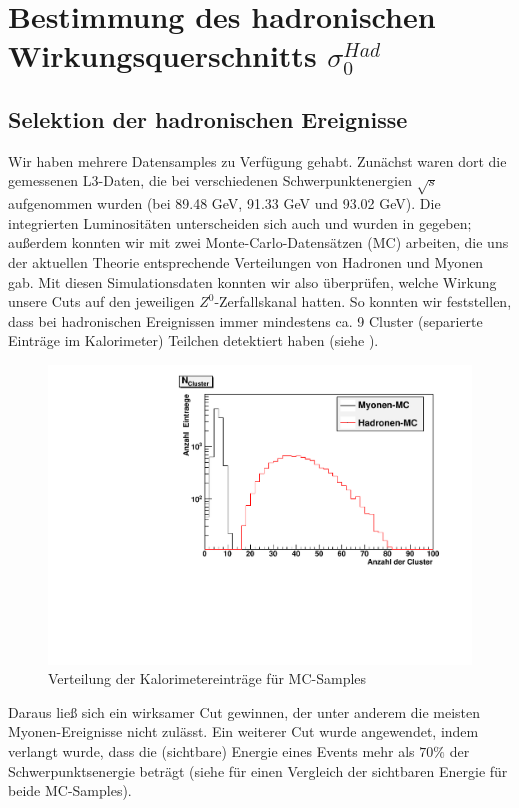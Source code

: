 \section{Bestimmung des hadronischen Wirkungsquerschnitts $\sigma_0^{Had}$}
\subsection{Selektion der hadronischen Ereignisse}
Wir haben mehrere Datensamples zu Verfügung gehabt. Zunächst waren dort die gemessenen L3-Daten, die bei verschiedenen Schwerpunktenergien $\sqrt{s}$ aufgenommen wurden (bei 89.48 GeV, 91.33 GeV und 93.02 GeV). Die integrierten Luminositäten unterscheiden sich auch und wurden in \cite[S.9]{script} gegeben; außerdem konnten wir mit zwei Monte-Carlo-Datensätzen (MC) arbeiten, die uns der aktuellen Theorie entsprechende Verteilungen von Hadronen und Myonen gab. Mit diesen Simulationsdaten konnten wir also überprüfen, welche Wirkung unsere Cuts auf den jeweiligen $Z^0$-Zerfallskanal hatten. So konnten wir feststellen, dass bei hadronischen Ereignissen immer mindestens ca. 9 Cluster (separierte Einträge im Kalorimeter) Teilchen detektiert haben (siehe ).
\begin{figure}[htb]
	\centering
	\includegraphics[width=1\columnwidth,keepaspectratio]{Ncluster_vgl.pdf}
	\caption{Verteilung der Kalorimetereinträge für MC-Samples}
	\label{fig:Ncluster_vgl}
\end{figure}
Daraus ließ sich ein wirksamer Cut gewinnen, der unter anderem die meisten Myonen-Ereignisse nicht zulässt. Ein weiterer Cut wurde angewendet, indem verlangt wurde, dass die (sichtbare) Energie eines Events mehr als $70\%$ der Schwerpunktsenergie beträgt (siehe  für einen Vergleich der sichtbaren Energie für beide MC-Samples).
